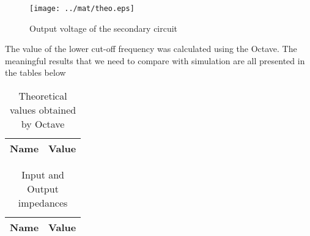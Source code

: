 \begin{figure}[H] \centering
\texttt{[image: ../mat/theo.eps]}
\caption{Output voltage of the secondary circuit}
\label{fig:mat2}
\end{figure}

The value of the lower cut-off frequency was calculated using the Octave. The meaningful results that we need to compare with simulation are all presented in the tables below

\begin{table}[H]
  \centering
  \begin{tabular}{|l|r|}
    \hline    
    {\bf Name} & {\bf Value} \\ \hline
    
  \end{tabular}
  \caption{Theoretical values obtained by Octave}
  \label{tab:mat3}
\end{table}


\begin{table}[H]
  \centering
  \begin{tabular}{|l|r|}
    \hline    
    {\bf Name} & {\bf Value} \\ \hline
    
  \end{tabular}
  \caption{Input and Output impedances}
  \label{tab:mat7}
\end{table}



